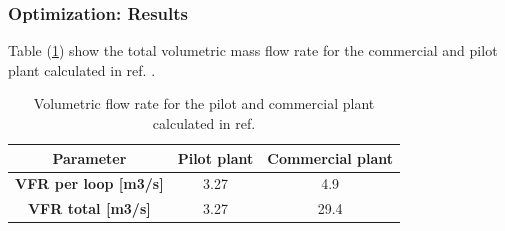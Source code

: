 \subsubsection{Optimization: Results}





Table (\ref{input_VFR}) show the total volumetric mass flow rate for the commercial and pilot plant calculated in ref. \cite{power_scenario}. 

\begin{table}[H]
	\centering
	\begin{tabular}{ccc}
		\rule[-0.3cm]{0pt}{0.8cm}\textbf{Parameter}               & \textbf{Pilot plant} & \textbf{Commercial plant} \\ \hline
		\rule[-0.3cm]{0pt}{0.8cm}\textbf{VFR per loop {[}m3/s{]}} & 3.27                 & 4.9                       \\ \hline
		\rule[-0.3cm]{0pt}{0.8cm}\textbf{VFR total {[}m3/s{]}}    & 3.27                 & 29.4                     \\ \hline
	\end{tabular}
	\caption{Volumetric flow rate for the pilot and commercial plant calculated in ref. \cite{power_scenario}}
	\label{input_VFR}
\end{table}

